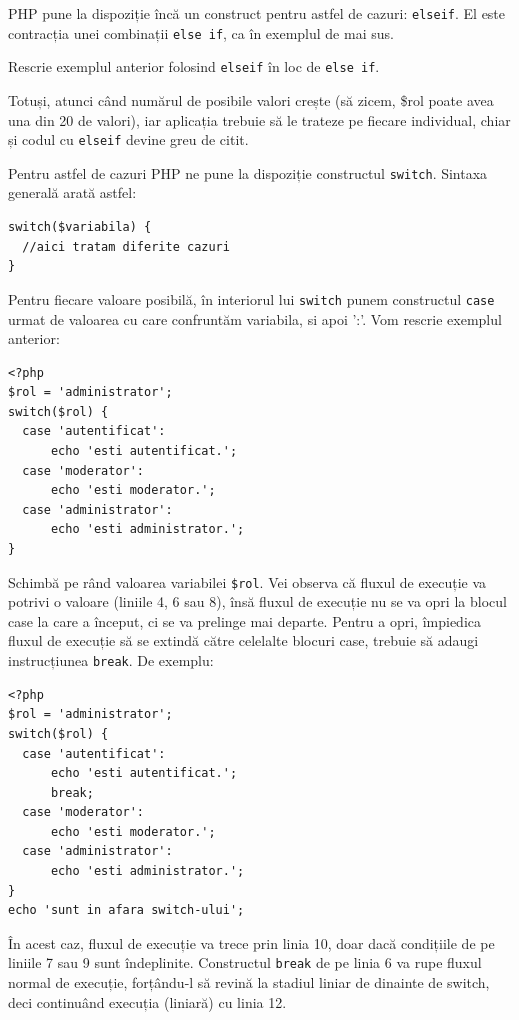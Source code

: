PHP pune la dispoziție încă un construct pentru astfel de cazuri: \texttt{elseif}.
El este contracția unei combinații \texttt{else if}, ca în exemplul de mai sus.

\begin{Exercise}[title={elseif}]
Rescrie exemplul anterior folosind \texttt{elseif} în loc de \texttt{else if}.
\end{Exercise}

Totuși, atunci când numărul de posibile valori crește (să zicem, \$rol poate avea
una din 20 de valori), iar aplicația trebuie să le trateze pe fiecare individual,
chiar și codul cu \texttt{elseif} devine greu de citit.

Pentru astfel de cazuri PHP ne pune la dispoziție constructul \texttt{switch}.
Sintaxa generală arată astfel:
\begin{lstlisting}
switch($variabila) {
  //aici tratam diferite cazuri
}
\end{lstlisting}
Pentru fiecare valoare posibilă, în interiorul lui \texttt{switch}
punem constructul \texttt{case} urmat de valoarea cu care confruntăm
variabila, si apoi ':'. Vom rescrie exemplul anterior:

\begin{lstlisting}
<?php
$rol = 'administrator';
switch($rol) {
  case 'autentificat':
	  echo 'esti autentificat.';
  case 'moderator':
	  echo 'esti moderator.';
  case 'administrator':
	  echo 'esti administrator.';
}
\end{lstlisting}
Schimbă pe rând valoarea variabilei \texttt{\$rol}. Vei observa că
fluxul de execuție va potrivi o valoare (liniile 4, 6 sau 8), însă
fluxul de execuție nu se va opri la blocul {\glqq}case{\grqq} la care a început,
ci se va {\glqq}prelinge{\grqq} mai departe. Pentru a opri, împiedica fluxul de
execuție să se extindă către celelalte blocuri {\glqq}case{\grqq}, trebuie să
adaugi instrucțiunea \texttt{break}. De exemplu:
\begin{lstlisting}
<?php
$rol = 'administrator';
switch($rol) {
  case 'autentificat':
	  echo 'esti autentificat.';
	  break;
  case 'moderator':
	  echo 'esti moderator.';
  case 'administrator':
	  echo 'esti administrator.';
}
echo 'sunt in afara switch-ului';
\end{lstlisting}
În acest caz, fluxul de execuție va trece prin linia 10, doar dacă
condițiile de pe liniile 7 sau 9 sunt îndeplinite. Constructul
\texttt{break} de pe linia 6 va rupe fluxul normal de execuție,
forțându-l să revină la stadiul liniar de dinainte de switch,
deci continuând execuția (liniară) cu linia 12.

